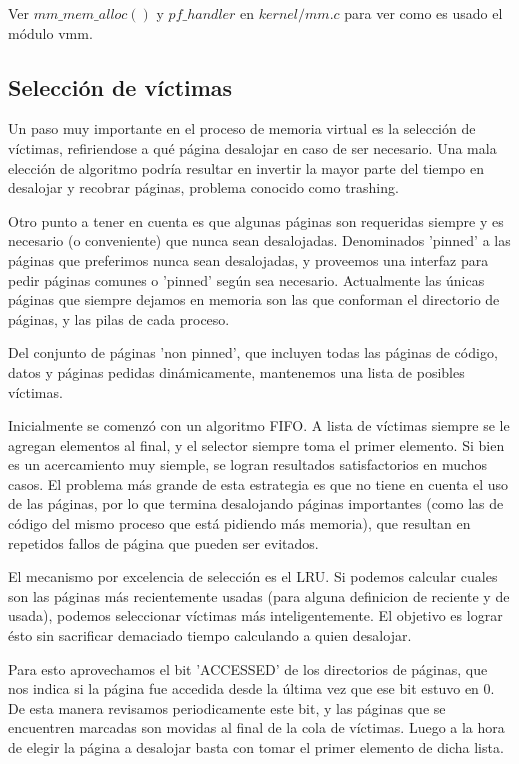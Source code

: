Ver $mm\_mem\_alloc()$ y $pf\_handler$ en $kernel/mm.c$ para ver como es usado
el módulo vmm.

\subsection{Selección de víctimas}

Un paso muy importante en el proceso de memoria virtual es la selección de
víctimas, refiriendose a qué página desalojar en caso de ser necesario. Una mala
elección de algoritmo podría resultar en invertir la mayor parte del tiempo en
desalojar y recobrar páginas, problema conocido como trashing.

Otro punto a tener en cuenta es que algunas páginas son requeridas siempre y es
necesario (o conveniente) que nunca sean desalojadas. Denominados 'pinned' a las
páginas que preferimos nunca sean desalojadas, y proveemos una interfaz para
pedir páginas comunes o 'pinned' según sea necesario. Actualmente las únicas
páginas que siempre dejamos en memoria son las que conforman el directorio de
páginas, y las pilas de cada proceso.

Del conjunto de páginas 'non pinned', que incluyen todas las páginas de
código, datos y páginas pedidas dinámicamente, mantenemos una lista de posibles
víctimas.

Inicialmente se comenzó con un algoritmo FIFO. A lista de víctimas
siempre se le agregan elementos al final, y el selector siempre toma el primer
elemento. Si bien es un acercamiento muy siemple, se logran resultados
satisfactorios en muchos casos. El problema más grande de esta estrategia es que
no tiene en cuenta el uso de las páginas, por lo que termina desalojando páginas
importantes (como las de código del mismo proceso que está pidiendo más
memoria), que resultan en repetidos fallos de página que pueden ser evitados.

El mecanismo por excelencia de selección es el LRU. Si podemos calcular cuales
son las páginas más recientemente usadas (para alguna definicion de reciente y
de usada), podemos seleccionar víctimas más inteligentemente. El objetivo es
lograr ésto sin sacrificar demaciado tiempo calculando a quien desalojar.

Para esto aprovechamos el bit 'ACCESSED' de los directorios de páginas, que nos
indica si la página fue accedida desde la última vez que ese bit estuvo en 0. De
esta manera revisamos periodicamente este bit, y las páginas que se encuentren
marcadas son movidas al final de la cola de víctimas. Luego a la hora de elegir
la página a desalojar basta con tomar el primer elemento de dicha lista.

